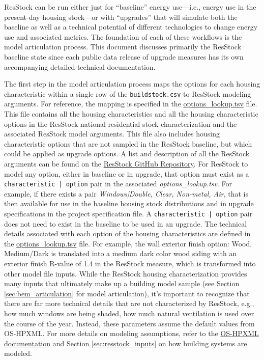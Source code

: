 ResStock can be run either just for ``baseline'' energy use---i.e., energy use in the present-day housing stock---or with ``upgrades'' that will simulate both the baseline as well as a technical potential of different technologies to change energy use and associated metrics. The foundation of each of these workflows is the model articulation process. This document discusses primarily the ResStock baseline state since each public data release of upgrade measures has its own accompanying detailed technical documentation.

The first step in the model articulation process maps the options for each housing characteristic within a single row of the \texttt{buildstock.csv} to ResStock modeling arguments. For reference, the mapping is specified in the \href{https://github.com/NREL/resstock/blob/v3.3.0/resources/options_lookup.tsv}{options\_lookup.tsv} file. This file contains all the housing characteristics and all the housing characteristic options in the ResStock national residential stock characterization and the associated ResStock model arguments. This file also includes housing characteristic options that are not sampled in the ResStock baseline, but which could be applied as upgrade options. A list and description of all the ResStock arguments can be found on the \href{https://github.com/NREL/resstock/releases/tag/2025_Release_1}{ResStock GitHub Repository}. For ResStock to model any option, either in baseline or in upgrade, that option must exist as a \texttt{characteristic | option}  pair in the associated \textit{options\_lookup.tsv}. For example, if there exists a pair \textit{Windows|Double, Clear, Non-metal, Air}, that is then available for use in the baseline housing stock distributions and in upgrade specifications in the project specification file. A \texttt{characteristic | option} pair does not need to exist in the baseline to be used in an upgrade. The technical details associated with each option of the housing characteristics are defined in the \href{https://github.com/NREL/resstock/blob/2025_Release_1/resources/options_lookup.tsv}{options\_lookup.tsv} file. For example, the wall exterior finish option: Wood, Medium/Dark is translated into a medium dark color wood siding with an exterior finish R-value of 1.4 in the ResStock measure, which is transformed into other model file inputs. While the ResStock housing characterization provides many inputs that ultimately make up a building model sample (see Section \ref{sec:bem_articulation} for model articulation), it’s important to recognize that there are far more technical details that are not characterized by ResStock, e.g., how much windows are being shaded, how much natural ventilation is used over the course of the year. Instead, these parameters assume the default values from OS-HPXML. For more details on modeling assumptions, refer to the \href{https://openstudio-hpxml.readthedocs.io/en/v1.10.0/}{OS-HPXML documentation} and Section \ref{sec:resstock_inputs} on how building systems are modeled.

